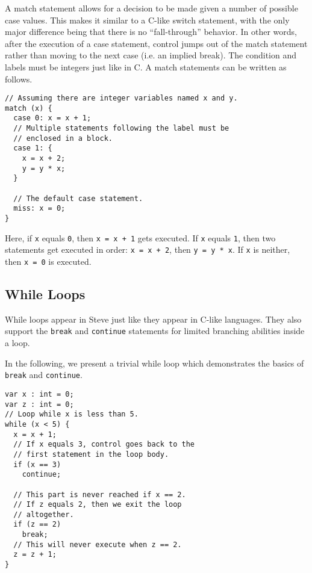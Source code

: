 A match statement allows for a decision to be made given a number of possible
case values. This makes it similar to a C-like switch statement, with the only
major difference being that there is no ``fall-through'' behavior. In other
words, after the execution of a case statement, control jumps out of the match
statement rather than moving to the next case (i.e. an implied break). The
condition and labels must be integers just like in C. A match statements can be
written as follows.

\begin{codepage}
\begin{lstlisting}
// Assuming there are integer variables named x and y.
match (x) {
  case 0: x = x + 1;
  // Multiple statements following the label must be
  // enclosed in a block.
  case 1: {
    x = x + 2;
    y = y * x;
  }

  // The default case statement.
  miss: x = 0;
}
\end{lstlisting}
\end{codepage}

Here, if \texttt{x} equals \texttt{0}, then \texttt{x = x + 1} gets executed. If
\texttt{x} equals \texttt{1}, then two statements get executed in order:
\texttt{x = x + 2}, then \texttt{y = y * x}. If \texttt{x} is neither, then
\texttt{x = 0} is executed.

\subsection{While Loops} \label{tut:while}

While loops appear in Steve just like they appear in C-like languages. They also
support the \texttt{break} and \texttt{continue} statements for limited
branching abilities inside a loop.

In the following, we present a trivial while loop which demonstrates the basics
of \texttt{break} and \texttt{continue}.

\begin{codepage}
\begin{lstlisting}
var x : int = 0;
var z : int = 0;
// Loop while x is less than 5.
while (x < 5) {
  x = x + 1;
  // If x equals 3, control goes back to the
  // first statement in the loop body.
  if (x == 3)
    continue;

  // This part is never reached if x == 2.
  // If z equals 2, then we exit the loop
  // altogether.
  if (z == 2)
    break;
  // This will never execute when z == 2.
  z = z + 1;
}
\end{lstlisting}
\end{codepage}

